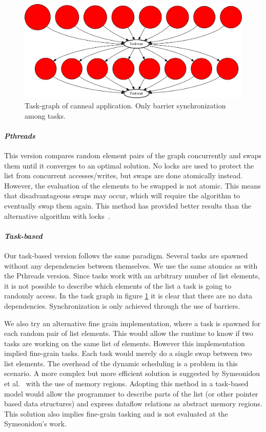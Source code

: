 {\begin{figure}[t!]%
	\center
	\includegraphics[width=.8\columnwidth]{task_benchmarks/figures/canneal_taskgraph}%
	\caption{Task-graph of canneal application.  Only barrier synchronization among tasks.}
	\label{fig:canneal_tg}%
	\vspace{.5cm}
\end{figure}

\paragraph{\textit{Pthreads}} This version compares random element pairs of the graph
concurrently and swaps them until it converges to an optimal solution.  No locks are used
to protect the list from concurrent accesses/writes, but  swaps are done atomically
instead. However, the evaluation of the elements to be swapped is not atomic.  This means
that disadvantageous swaps may occur, which will require the algorithm to eventually swap
them again.  This method has provided better results than the alternative algorithm with
locks~\cite{bienia2008}.

\paragraph{\textit{Task-based}} Our task-based version follows the same paradigm.  Several
tasks are spawned without any dependencies between themselves. We use the same atomics as
with the Pthreads version.  Since tasks work with an arbitrary number of list elements, it
is not possible to describe which elements of the list a task is going to randomly access. 
In the task graph in figure \ref{fig:canneal_tg} it is clear that there are no data dependencies.
Synchronization is only achieved through the use of barriers.

We also try an alternative fine grain implementation, where a task is spawned for each
random pair of list elements.  This would allow the runtime to know if two tasks are
working on the same list of elements. However this implementation implied fine-grain
tasks. Each task would merely do a single swap between two list elements.  The overhead of
the dynamic scheduling is a problem in this scenario.  A more complex but more efficient
solution is suggested by Symeonidou et al.~\cite{Symeonidou:2013:DDR:2488551.2488558} with
the use of memory regions.  Adopting this method in a task-based model would allow the
programmer to describe parts of the list (or other pointer based data structures) and
express dataflow relations as abstract memory regions.  This solution also implies
fine-grain tasking and is not evaluated at the Symeonidou's work. 

}

